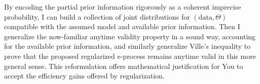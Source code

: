 \documentclass[a4paper, 12pt]{article}
\theoremstyle{plain}
\theoremstyle{definition}
\theoremstyle{remark}
\begin{document}
By encoding the partial prior information rigorously as a coherent imprecise probability, I can build a collection of joint distributions for $(\text{data}, \Theta)$ compatible with the assumed model and available prior information.  Then I generalize the now-familiar anytime validity property in a sound way, accounting for the available prior information, and similarly generalize Ville's inequality to prove that the proposed regularized e-process remains anytime valid in this more general sense.  This reformulation offers mathematical justification for You to accept the efficiency gains offered by regularization.  


\end{document}

